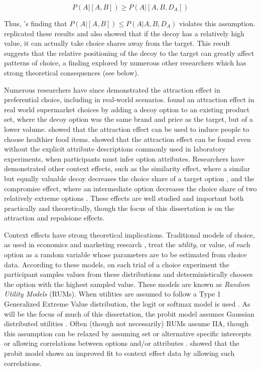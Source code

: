 \begin{equation}
  P(A|[A,B])\geq P(A|[A,B,D_{A}])
  \label{eqn:reg_att}
\end{equation}

Thus, \textcite{huberAddingAsymmetricallyDominated1982d}'s finding that $P(A|[A,B])\leq P(A|A,B,D_{A})$ violates this assumption. \textcite{huber1983market} replicated these results and also showed that if the decoy has a relatively high value, it can actually take choice shares away from the target. This result suggests that the relative positioning of the decoy to the target can greatly affect patterns of choice, a finding explored by numerous other researchers which has strong theoretical consequences (see below). 

Numerous researchers have since demonstrated the attraction effect in preferential choice, including in real-world scenarios. \textcite{doyleRobustnessAsymmetricallyDominated1999} found an attraction effect in real world supermarket choices by adding a decoy option to an existing product set, where the decoy option was the same brand and price as the target, but of a lower volume. \textcite{van2021attract} showed that the attraction effect can be used to induce people to choose healthier food items. \textcite{slaughterDecoyEffectsAttributelevel1999b} showed that the attraction effect can be found even without the explicit attribute descriptions commonly used in laboratory experiments, when participants must infer option attributes. Researchers have demonstrated other context effects, such as the similarity effect, where a similar but equally valuable decoy decreases the choice share of a target option \parencite{tverskyEliminationAspectsTheory1972}, and the compromise effect, where an intermediate option decreases the choice share of two relatively extreme options \parencite{simonsonChoiceBasedReasons1989b}. These effects are well studied and important both practically and theoretically, though the focus of this dissertation is on the attraction and repulsione effects.

Context effects have strong theoretical implications. Traditional models of choice, as used in economics and marketing research \parencite{mcfadden2001economic}, treat the \textit{utility}, or value, of each option as a random variable whose parameters are to be estimated from choice data. According to these models, on each trial of a choice experiment the participant samples values from these distributions and deterministically chooses the option with the highest sampled value. These models are known as \textit{Random Utility Models} (RUMs). When utilities are assumed to follow a Type 1 Generalized Extreme Value distribution, the logit or softmax model is used \parencite{gensch1979multinomial}. As will be the focus of much of this dissertation, the probit model assumes Gaussian distributed utilities \parencite{bolduc1999practical}. Often (though not necessarily) RUMs assume IIA, though this assumption can be relaxed by assuming set or alternative specific intercepts \parencite{rooderkerk2011incorporating} or allowing correlations between options and/or attributes \parencite{haaijer1998utility}. \textcite{haaijer1998utility} showed that the probit model shows an improved fit to context effect data by allowing such correlations. 


